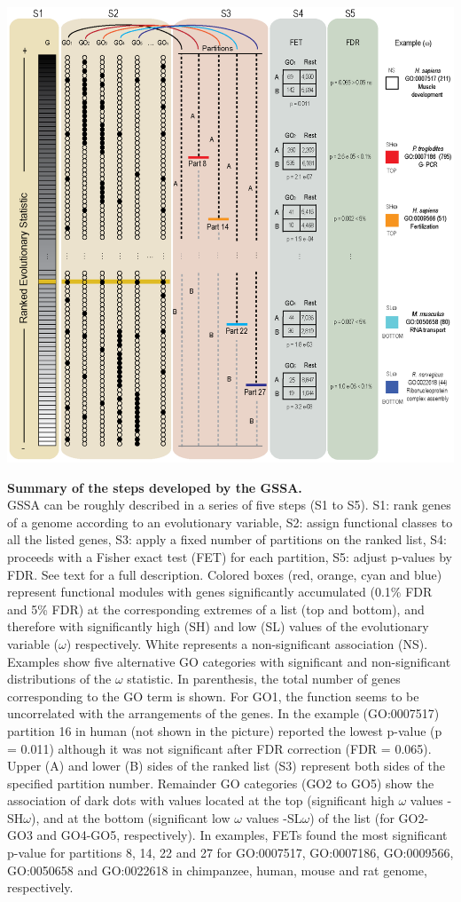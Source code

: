 \begin{FPfigure}
\centering 
\includegraphics[width=\textwidth]{tex_source/figures/gssa/gssa_met.pdf}
\caption[Summary of the steps developed by the GSSA.]{{\bf Summary of the steps developed by the GSSA.} \\GSSA can be roughly described in a series of five steps (S1 to S5). S1: rank genes of a genome according to an evolutionary variable, S2: assign functional classes to all the listed genes, S3: apply a fixed number of partitions on the ranked list, S4: proceeds with a Fisher exact test (FET) for each partition, S5: adjust p-values by FDR. See text for a full description. Colored boxes (red, orange, cyan and blue) represent functional modules with genes significantly accumulated (0.1\% FDR and 5\% FDR) at the corresponding extremes of a list (top and bottom), and therefore with significantly high (SH) and low (SL) values of the evolutionary variable ($\omega$) respectively. White represents a non-significant association (NS). Examples show five alternative GO categories with significant and non-significant distributions of the $\omega$ statistic. In parenthesis, the total number of genes corresponding to the GO term is shown. For GO1, the function seems to be uncorrelated with the arrangements of the genes. In the example (GO:0007517) partition 16 in human (not shown in the picture) reported the lowest p-value (p = 0.011) although it was not significant after FDR correction (FDR = 0.065). Upper (A) and lower (B) sides of the ranked list (S3) represent both sides of the specified partition number. Remainder GO categories (GO2 to GO5) show the association of dark dots with values located at the top (significant high $\omega$ values -SH$\omega$), and at the bottom (significant low $\omega$ values -SL$\omega$) of the list (for GO2-GO3 and GO4-GO5, respectively). In examples, FETs found the most significant p-value for partitions 8, 14, 22 and 27 for GO:0007517, GO:0007186, GO:0009566, GO:0050658 and GO:0022618 in chimpanzee, human, mouse and rat genome, respectively.}

\end{FPfigure}
